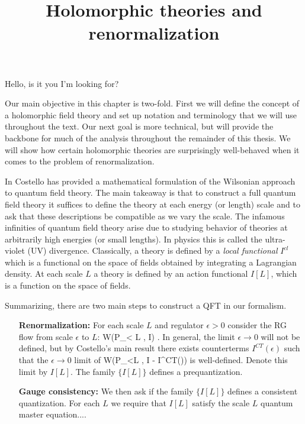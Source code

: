 \documentclass[10pt]{amsart}
\title{Holomorphic theories and renormalization}
\begin{document}
\maketitle
\tableofcontents

Hello, is it you I’m looking for?

Our main objective in this chapter is two-fold. 
First we will define the concept of a holomorphic field theory and set up notation and terminology that we will use throughout the text. 
Our next goal is more technical, but will provide the backbone for much of the analysis throughout the remainder of this thesis.
We will show how certain holomorphic theories are surprisingly well-behaved when it comes to the problem of renormalization. 

In \cite{CostelloRenormalization} Costello has provided a mathematical formulation of the Wilsonian approach to quantum field theory.
The main takeaway is that to construct a full quantum field theory it suffices to define the theory at each energy (or length) scale and to ask that these descriptions be compatible as we vary the scale.
The infamous infinities of quantum field theory arise due to studying behavior of theories at arbitrarily high energies (or small lengths). 
In physics this is called the ultra-violet (UV) divergence. 
Classically, a theory is defined by a {\em local functional} $I^{cl}$ which is a functional on the space of fields obtained by integrating a Lagrangian density.
At each scale $L$ a theory is defined by an action functional $I[L]$, which is a function on the space of fields. 

Summarizing, there are two main steps to construct a QFT in our formalism.
\begin{itemize}
\item[{\bf Renormalization:}] For each scale $L$ and regulator $\epsilon > 0$ consider the RG flow from scale $\epsilon$ to $L$:
\be
W(P_{\epsilon < L} , I) .
\ee
In general, the limit $\epsilon \to 0$ will not be defined, but by Costello's main result there exists counterterms $I^{CT}(\epsilon)$ such that the $\epsilon \to 0$ limit of 
\ben
W(P_{\epsilon<L} , I - I^{CT}(\epsilon))
\een
is well-defined. 
Denote this limit by $I[L]$.
The family $\{I[L]\}$ defines a prequantization.
\item[{\bf Gauge consistency:}] We then ask if the family $\{I[L]\}$ defines a consistent quantization.
For each $L$ we require that $I[L]$ satisfy the scale $L$ quantum master equation....
\end{itemize}
\end{document}
